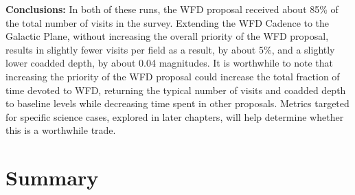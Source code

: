 {\bf Conclusions:} In both of these runs, the WFD proposal received
about 85\% of the total number of visits in the survey. Extending the
WFD Cadence to the Galactic Plane, without increasing the
overall priority of the WFD proposal, results in slightly fewer
visits per field as a result, by about 5\%, and a slightly lower
coadded depth, by about 0.04 magnitudes. It is worthwhile to note that
increasing the priority of the WFD proposal could increase the total
fraction of time devoted to WFD, returning the typical number of
visits and coadded depth to baseline levels while decreasing time
spent in other proposals. Metrics targeted for specific science cases,
explored in later chapters, will help determine whether this is a
worthwhile trade.

\navigationbar





%
%
%
%
%
%
%
%
%
%
%

\section{Summary}
\def\secname{cadexp:summary}\label{sec:\secname}


